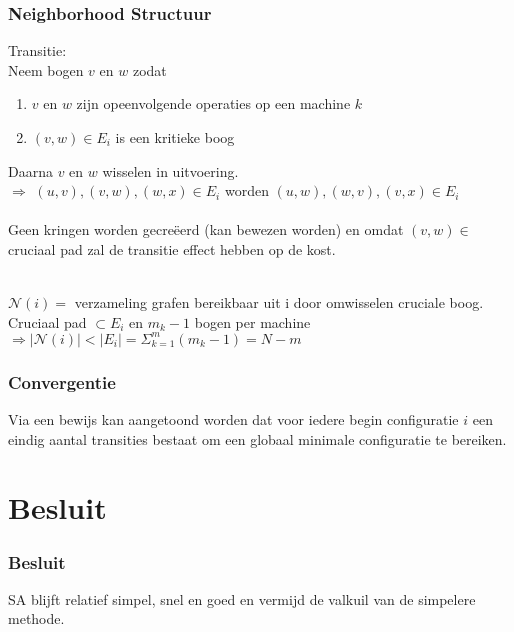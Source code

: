 \documentclass
   [kulak] %
   {kulakbeamer}
\newcommand\tab[1][1cm]{\hspace*{#1}}
\begin{document}
\begin{frame}
\frametitle{Neighborhood Structuur}
	Transitie:\\Neem bogen $v$ en $w$ zodat
	\begin{enumerate}
		\item $v$ en $w$ zijn opeenvolgende operaties op een machine $k$\\
		\item $(v, w)\in E_i$ is een kritieke boog\\ 
	\end{enumerate}
	Daarna $v$ en $w$ wisselen in uitvoering.\\
	\tab $\Rightarrow$ $(u, v),(v,w),(w, x) \in E_i$ worden $(u, w),(w,v),(v, x) \in E_i$\\~\\
\pause
		 Geen kringen worden gecreëerd (kan bewezen worden) en omdat $(v,w) \in$ cruciaal pad zal de transitie effect hebben op de kost.
	
	~\\
	$\mathscr{N}(i) =$ verzameling grafen bereikbaar uit i door omwisselen cruciale boog. Cruciaal pad $\subset E_i$ en $m_k - 1$ bogen per machine \\
	$\Rightarrow |\mathscr{N}(i)| < |E_i| = \Sigma_{k=1}^m (m_k - 1) = N - m$
\end{frame}

\begin{frame}
\frametitle{Convergentie}
	Via een bewijs kan aangetoond worden dat voor iedere begin configuratie $i$ een eindig aantal transities bestaat om een globaal minimale configuratie te bereiken.
\end{frame}

\section{Besluit}
\begin{frame}
\frametitle{Besluit}
SA blijft relatief simpel, snel en goed en vermijd de valkuil van de simpelere methode.
\end{frame}
\end{document}

